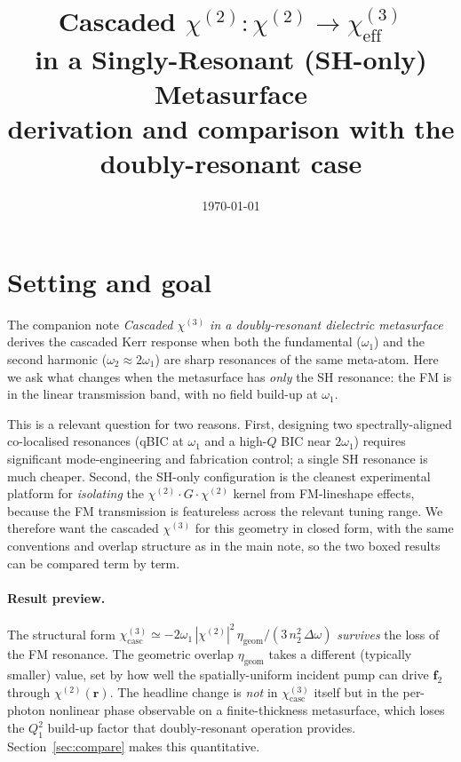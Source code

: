 \documentclass[11pt,a4paper]{article}
\newcommand{\bvec}[1]{\mathbf{#1}}
\newcommand{\f}{\bvec{f}}
\newcommand{\ri}{\bvec{r}}
\newcommand{\chitwo}{\chi^{(2)}}
\newcommand{\chithree}{\chi^{(3)}}
\newcommand{\Dom}{\Delta\omega}
\begin{document}
\title{Cascaded $\chi^{(2)}{:}\chi^{(2)} \to \chi^{(3)}_\text{eff}$\\
       in a Singly-Resonant (SH-only) Metasurface \\[2pt]
       \large derivation and comparison with the doubly-resonant case}
\author{}
\date{\today}
\maketitle

\section{Setting and goal}\label{sec:setting}

The companion note \emph{Cascaded $\chithree$ in a doubly-resonant dielectric
metasurface} derives the cascaded Kerr response when both the fundamental
($\omega_1$) and the second harmonic ($\omega_2\approx 2\omega_1$) are
sharp resonances of the same meta-atom.  Here we ask what changes when the
metasurface has \emph{only} the SH resonance: the FM is in the linear
transmission band, with no field build-up at $\omega_1$.

This is a relevant question for two reasons.  First, designing two
spectrally-aligned co-localised resonances (qBIC at $\omega_1$ and a high-$Q$
BIC near $2\omega_1$) requires significant mode-engineering and fabrication
control; a single SH resonance is much cheaper.  Second, the SH-only
configuration is the cleanest experimental platform for \emph{isolating}
the $\chitwo\!\cdot\!G\!\cdot\!\chitwo$ kernel from FM-lineshape effects,
because the FM transmission is featureless across the relevant tuning
range.  We therefore want the cascaded $\chithree$ for this geometry in
closed form, with the same conventions and overlap structure as in the main
note, so the two boxed results can be compared term by term.

\paragraph{Result preview.}
The structural form
$\chithree_{\text{casc}}\simeq -2\omega_1\,|\chitwo|^{2}\,\eta_\text{geom}/(3\,n_2^{2}\,\Dom)$
\emph{survives} the loss of the FM resonance.  The geometric overlap
$\eta_\text{geom}$ takes a different (typically smaller) value, set by how
well the spatially-uniform incident pump can drive $\f_2$ through
$\chitwo(\ri)$.  The headline change is \emph{not} in $\chithree_\text{casc}$
itself but in the per-photon nonlinear phase observable on a finite-thickness
metasurface, which loses the $Q_1^{2}$ build-up factor that doubly-resonant
operation provides.  Section~\ref{sec:compare} makes this quantitative.
\end{document}
